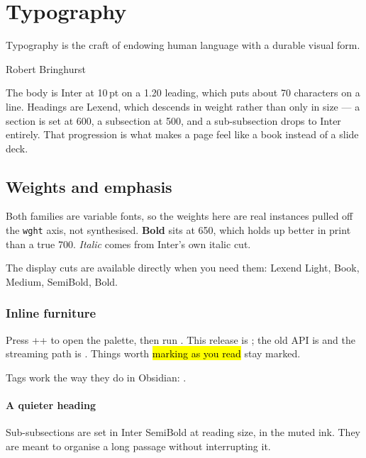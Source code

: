 \chapter{Typography}
\label{cha:typography}
\epigraph{Typography is the craft of endowing human language with a durable
visual form.}{Robert Bringhurst}

The body is Inter at 10\,pt on a 1.20 leading, which puts about 70 characters on a line. Headings are Lexend, which descends in weight rather than only in size — a section is set at 600, a
subsection at 500, and a sub-subsection drops to Inter entirely. That
progression is what makes a page feel like a book instead of a slide deck.

\section{Weights and emphasis}

Both families are variable fonts, so the weights here are real instances
pulled off the \texttt{wght} axis, not synthesised. \textbf{Bold} sits at 650,
which holds up better in print than a true 700. \emph{Italic} comes from
Inter's own italic cut.

The display cuts are available directly when you need them:
{\displaylight Lexend Light}, {\displaybook Book}, {\displaymed Medium},
{\displaysemi SemiBold}, {\displaybold Bold}.

\subsection{Inline furniture}

Press ++ to open the palette, then run
. This release is ; the
old API is  and the streaming path is
. Things worth \hl{marking as you read} stay marked.

Tags work the way they do in Obsidian: 
 .

\subsubsection{A quieter heading}

Sub-subsections are set in Inter SemiBold at reading size, in the muted ink.
They are meant to organise a long passage without interrupting it.


